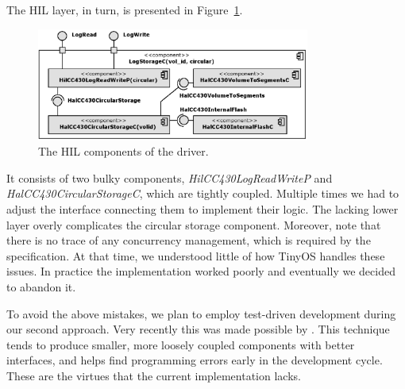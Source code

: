 The HIL layer, in turn, is presented in Figure~\ref{fig:log_storage_c}.
\begin{figure}[h]
  \centering
  \includegraphics[width=0.8\textwidth]{diagrams/log_storage_c.eps}
  \caption{The HIL components of the driver.}
  \label{fig:log_storage_c}
\end{figure}
It consists of two bulky components, \emph{HilCC430LogReadWriteP} and \emph{HalCC430CircularStorageC}, which are tightly coupled.
Multiple times we had to adjust the interface connecting them to implement their logic. The lacking lower layer overly complicates the circular storage component. Moreover, note that there is no trace of any concurrency management, which is required by the specification. At that time, we understood little of how TinyOS handles these issues. In practice the implementation worked poorly and eventually we decided to abandon it.

To avoid the above mistakes, we plan to employ test-driven development during our second approach. Very recently this was made possible by \cite{TOSMock}. This technique tends to produce smaller, more loosely coupled components with better interfaces, and helps find programming errors early in the development cycle. These are the virtues that the current implementation lacks.


